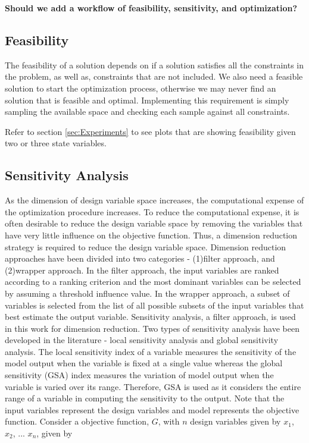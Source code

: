 \documentclass[10pt]{article}
\begin{document}
\textbf{Should we add a workflow of feasibility, sensitivity, and optimization?}

\subsection{Feasibility}
\label{sec:Feasibility}

The feasibility of a solution depends on if a solution satisfies all the constraints in the problem, as well as, constraints that are not included. We also need a feasible solution to start the optimization process, otherwise we may never find an solution that is feasible and optimal. Implementing this requirement is simply sampling the available space and checking each sample against all constraints. 

Refer to section \ref{sec:Experiments} to see plots that are showing feasibility given two or three state variables.

\subsection{Sensitivity Analysis}
\label{sec:Sensitivity}
\hspace{5 mm} As the dimension of design variable space increases, the computational expense of the optimization procedure increases. To reduce the computational expense, it is often desirable to reduce the design variable space by removing the variables that have very little influence on the objective function. Thus, a dimension reduction strategy is required to reduce the design variable space. Dimension reduction approaches have been divided into two categories - (1)filter approach, and (2)wrapper approach. In the filter approach, the input variables are ranked according to a ranking criterion and the most dominant variables can be selected by assuming a threshold influence value. In the wrapper approach, a subset of variables is selected from the list of all possible subsets of the input variables that best estimate the output variable. Sensitivity analysis, a filter approach, is used in this work for dimension reduction. Two types of sensitivity analysis have been developed in the literature - local sensitivity analysis and global sensitivity analysis. The local sensitivity index of a variable measures the sensitivity of the model output when the variable is fixed at a single value whereas the global sensitivity (GSA) index measures the variation of model output when the variable is varied over its range. Therefore, GSA is used as it considers the entire range of a variable in computing the sensitivity to the output. Note that the input variables represent the design variables and model represents the objective function.
Consider a objective function, $G$, with $n$ design variables given by $x_{1}$, $x_{2}$, ...  $x_{n}$, given by
\end{document}
